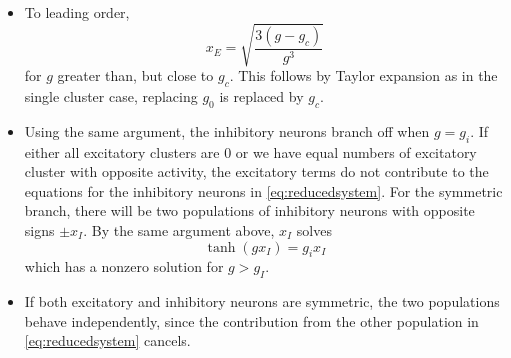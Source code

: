 \documentclass[11pt,reqno]{amsart}
\begin{document}
\begin{itemize}
    \item To leading order,
    \[
    x_E = \sqrt{ \frac{3(g-g_c)}{g^3} }
    \]
    for $g$ greater than, but close to $g_c$. This follows by Taylor expansion as in the single cluster case, replacing $g_0$ is replaced by $g_c$.
    
    \item Using the same argument, the inhibitory neurons branch off when $g = g_i$. If either all excitatory clusters are 0 or we have equal numbers of excitatory cluster with opposite activity, the excitatory terms do not contribute to the equations for the inhibitory neurons in \cref{eq:reducedsystem}. For the symmetric branch, there will be two populations of inhibitory neurons with opposite signs $\pm x_I$. By the same argument above, $x_I$ solves
    \[
    \tanh(g x_I) = g_i x_I
    \]
    which has a nonzero solution for $g > g_I$. 
    \item If both excitatory and inhibitory neurons are symmetric, the two populations behave independently, since the contribution from the other population in \cref{eq:reducedsystem} cancels.
\end{itemize}
\end{document}

